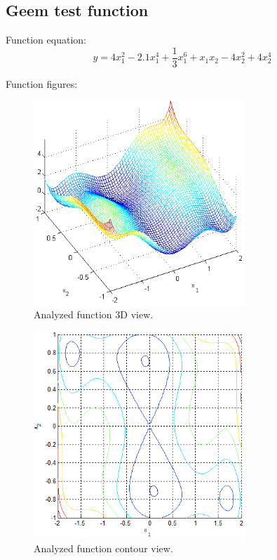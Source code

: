 \documentclass[12pt]{article}
\begin{document}
\subsection{Geem test function}
Function equation:
\begin{equation}
y=4x_1^2-2.1x_1^4+\frac{1}{3}x_1^6+x_1x_2-4x_2^2+4x_2^4
\end{equation}

Function figures:
\begin{figure}[H]
	\includegraphics[width=8cm]{gem_3D.png}
	\caption{Analyzed function 3D view.}
\end{figure}
\begin{figure}[H]
	\includegraphics[width=8cm]{gem_cont.png}
	\caption{Analyzed function contour view.}
\end{figure}
\end{document}
